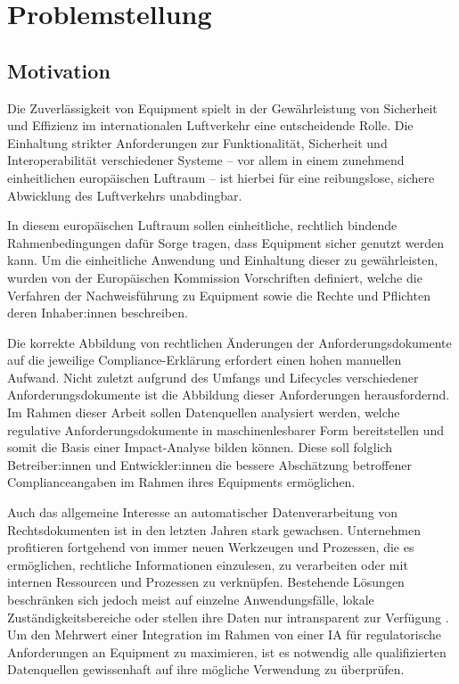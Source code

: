 \chapter{Problemstellung}

\section{Motivation}
    
    Die Zuverlässigkeit von \atmans{} Equipment spielt in der Gewährleistung von Sicherheit und Effizienz im internationalen Luftverkehr eine entscheidende Rolle. 
    Die Einhaltung strikter Anforderungen zur Funktionalität, Sicherheit und Interoperabilität verschiedener \atmans{} Systeme -- vor allem in einem zunehmend einheitlichen europäischen Luftraum -- ist hierbei für eine reibungslose, sichere Abwicklung des Luftverkehrs unabdingbar. 

    \medskip
    In diesem europäischen Luftraum sollen einheitliche, rechtlich bindende Rahmenbedingungen dafür Sorge tragen, dass \atmans{} Equipment sicher genutzt werden kann.
    Um die einheitliche Anwendung und Einhaltung dieser zu gewährleisten, wurden von der Europäischen Kommission Vorschriften definiert, welche die Verfahren der Nachweisführung zu \atmans{} Equip\-ment sowie die Rechte und Pflichten deren Inhaber:innen beschreiben. \cite[Art.43]{2018R1139} 
        
    \medskip
    Die korrekte Abbildung von rechtlichen Änderungen der Anforderungsdokumente auf die jeweilige Compliance-Erklärung erfordert einen hohen manuellen Aufwand.
    Nicht zuletzt aufgrund des Umfangs und Lifecycles verschiedener Anforderungsdokumente ist die Abbildung dieser Anforderungen herausfordernd.
    Im Rahmen dieser Arbeit sollen Datenquellen analysiert werden, welche regulative Anforderungsdokumente in maschinenlesbarer Form bereitstellen und somit die Basis einer Impact-Analyse bilden können. 
    Diese soll folglich Betreiber:innen und Entwickler:innen die bessere Abschätzung betroffener Complianceangaben im Rahmen ihres \atmans{} Equipments ermöglichen.

    \medskip
    Auch das allgemeine Interesse an automatischer Datenverarbeitung von Rechtsdokumenten ist in den letzten Jahren stark gewachsen.
    Unternehmen profitieren fortgehend von immer neuen Werkzeugen und Prozessen, die es ermöglichen, rechtliche Informationen einzulesen, zu verarbeiten oder mit internen Ressourcen und Prozessen zu verknüpfen.
    Bestehende Lösungen beschränken sich jedoch meist auf einzelne Anwendungsfälle, lokale Zuständigkeitsbereiche oder stellen ihre Daten nur intransparent zur Verfügung \cite[385]{eu_open_legal_info}. 
    Um den Mehrwert einer Integration im Rahmen von einer \ac{IA} für regulatorische Anforderungen an \atmans{} Equipment zu maximieren, ist es notwendig alle qualifizierten Datenquellen gewissenhaft auf ihre mögliche Verwendung zu überprüfen. 
        
